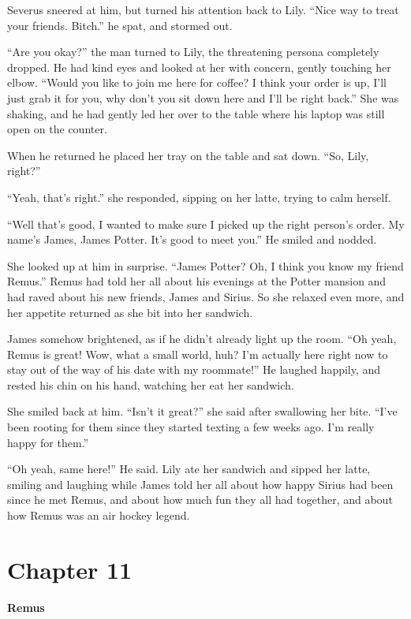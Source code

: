 \documentclass[12pt,twoside,openright]{memoir}
\begin{document}
Severus sneered at him, but turned his attention back to Lily. ``Nice way to treat your friends. Bitch.'' he spat, and stormed out.

``Are you okay?'' the man turned to Lily, the threatening persona completely dropped. He had kind eyes and looked at her with concern, gently touching her elbow. ``Would you like to join me here for coffee? I think your order is up, I'll just grab it for you, why don't you sit down here and I'll be right back.'' She was shaking, and he had gently led her over to the table where his laptop was still open on the counter.

When he returned he placed her tray on the table and sat down. ``So, Lily, right?''

``Yeah, that's right.'' she responded, sipping on her latte, trying to calm herself.

``Well that's good, I wanted to make sure I picked up the right person's order. My name's James, James Potter. It's good to meet you.'' He smiled and nodded.

She looked up at him in surprise. ``James Potter? Oh, I think you know my friend Remus.'' Remus had told her all about his evenings at the Potter mansion and had raved about his new friends, James and Sirius. So she relaxed even more, and her appetite returned as she bit into her sandwich.

James somehow brightened, as if he didn't already light up the room. ``Oh yeah, Remus is great! Wow, what a small world, huh? I'm actually here right now to stay out of the way of his date with my roommate!'' He laughed happily, and rested his chin on his hand, watching her eat her sandwich.

She smiled back at him. ``Isn't it great?'' she said after swallowing her bite. ``I've been rooting for them since they started texting a few weeks ago. I'm really happy for them.''

``Oh yeah, same here!'' He said. Lily ate her sandwich and sipped her latte, smiling and laughing while James told her all about how happy Sirius had been since he met Remus, and about how much fun they all had together, and about how Remus was an air hockey legend.

\chapter*{Chapter 11}

\textbf{Remus} 
\end{document}
